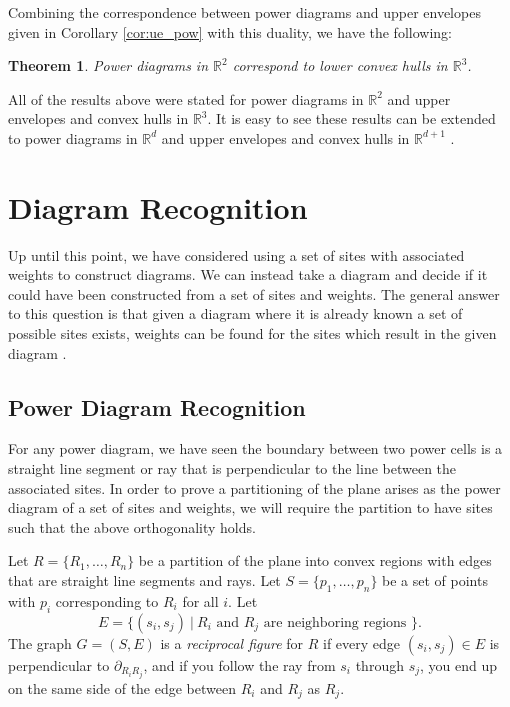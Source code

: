 \documentclass[a4paper, 11pt]{article}
\newtheorem{theorem}{Theorem}[section]
\newcommand{\R}{\mathbb{R}}
\begin{document}
Combining the correspondence between power diagrams and upper envelopes given in Corollary \ref{cor:ue_pow} with this duality, we have the following:

\begin{theorem}
  Power diagrams in $\R^2$ correspond to lower convex hulls in $\R^3$.
  \label{thm:ch_pow}
\end{theorem}

All of the results above were stated for power diagrams in $\R^2$ and upper envelopes and convex hulls in $\R^3$. It is easy to see these results can
be extended to power diagrams in $\R^d$ and upper envelopes and convex hulls in $\R^{d+1}$ \cite{aurenhammer_power}.

\section{Diagram Recognition}

Up until this point, we have considered using a set of sites with associated weights to construct diagrams. We can instead take a diagram and decide
if it could have been constructed from a set of sites and weights. The general answer to this question is that given a diagram where it is already
known a set of possible sites exists, weights can be found for the sites which result in the given diagram \cite{ash-bolker}.

\subsection{Power Diagram Recognition}

For any power diagram, we have seen the boundary between two power cells is a straight line segment or ray that is perpendicular to the line between
the associated sites. In order to prove a partitioning of the plane arises as the power diagram of a set of sites and weights, we will require the
partition to have sites such that the above orthogonality holds.

Let $R = \{ R_1,\dots, R_n \}$ be a partition of the plane into convex regions with edges that are straight line segments and rays. Let $S = \{ p_1,
\dots, p_n \}$ be a set of points with $p_i$ corresponding to $R_i$ for all $i$. Let
\[ E = \{ (s_i, s_j) \ | \ R_i \text{ and } R_j \text{ are neighboring regions } \} . \]
The graph $G = (S,E)$ is a \textit{reciprocal figure} for $R$ if every edge $(s_i, s_j) \in E$ is perpendicular to $\partial_{R_i R_j}$,
and if you follow the ray from $s_i$ through $s_j$, you end up on the same side of the edge between $R_i$ and $R_j$ as $R_j$.
\end{document}
